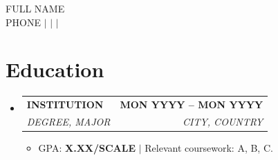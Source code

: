 \newcommand{\resumeItem}[1]{\item\small{#1 \vspace{-2pt}}}
\newcommand{\resumeSubheading}[4]{\vspace{-2pt}\item
  \begin{tabular*}{1.0\textwidth}[t]{l@{\extracolsep{\fill}}r}
    \textbf{#1} & \textbf{\small #2} \\ \textit{\small#3} & \textit{\small #4} \\
  \end{tabular*}\vspace{-7pt}}
\newcommand{\resumeProjectHeading}[1]{\vspace{-2pt}\item
  \begin{tabular*}{1.0\textwidth}{l}\small\textbf{#1} \\ \end{tabular*}\vspace{-2pt}}
\newcommand{\techstack}[1]{\vspace{2pt}{\small\hspace{0.01in}\textit{Tech: #1}}\vspace{-2pt}}
\renewcommand\labelitemii{$\vcenter{\hbox{\tiny$\bullet$}}$}
\newcommand{\resumeSubHeadingListStart}{\begin{itemize}[leftmargin=0.0in, label={}]}
\newcommand{\resumeSubHeadingListEnd}{\end{itemize}}
\newcommand{\resumeItemListStart}{\begin{itemize}[leftmargin=0.15in]}
\newcommand{\resumeItemListEnd}{\end{itemize}\vspace{-5pt}}



\begin{center}
    {\large \scshape FULL NAME} \\ \vspace{3pt}
    \small
    PHONE $|$
     $|$
     $|$
\end{center}

\section{Education}
\resumeSubHeadingListStart
  \resumeSubheading{INSTITUTION}{MON YYYY -- MON YYYY}{DEGREE, MAJOR}{CITY, COUNTRY}
    \resumeItemListStart
      \resumeItem{GPA: \textbf{X.XX/SCALE} $|$ Relevant coursework: A, B, C.}
    \resumeItemListEnd
\resumeSubHeadingListEnd

